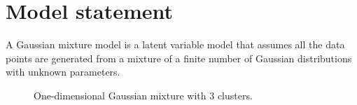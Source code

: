 \section{Model statement}

A Gaussian mixture model is a latent variable model that assumes all the data points are generated from a mixture of a finite number of Gaussian distributions with unknown parameters.

\begin{figure}[h!]
  \centering
  \caption{One-dimensional Gaussian mixture with 3 clusters.}
\end{figure}


